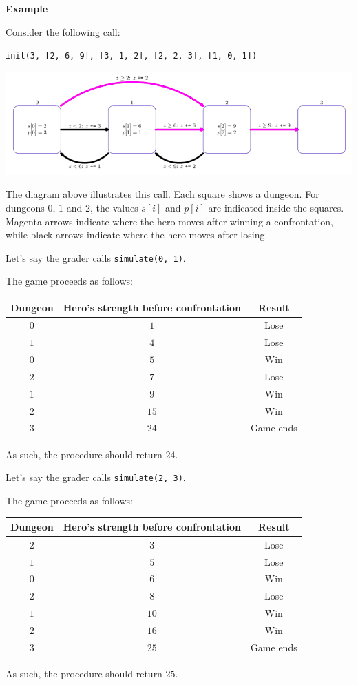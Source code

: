 \textbf{Example}

Consider the following call:

\texttt{init(3, [2, 6, 9], [3, 1, 2], [2, 2, 3], [1, 0, 1])}

\includegraphics[scale=0.6]{1.png}

The diagram above illustrates this call. Each square shows a dungeon. For dungeons $0$, $1$ and $2$,
the values $s[i]$ and $p[i]$ are indicated inside the squares. Magenta arrows indicate where the hero
moves after winning a confrontation, while black arrows indicate where the hero moves after losing.

Let's say the grader calls \texttt{simulate(0, 1)}.

The game proceeds as follows:

\begin{center}
\renewcommand{\arraystretch}{1.5}
\begin{tabular}{|c|c|c|}
\hline
 Dungeon & Hero's strength before confrontation & Result \\
\hline
 $0$ & $1$ & Lose \\
\hline
 $1$ & $4$ & Lose \\
\hline
 $0$ & $5$ & Win \\
\hline
 $2$ & $7$ & Lose \\
\hline
 $1$ & $9$ & Win \\
\hline
 $2$ & $15$ & Win \\
\hline
 $3$ & $24$ & Game ends \\
\hline
\end{tabular}
\end{center}

As such, the procedure should return $24$.

Let's say the grader calls \texttt{simulate(2, 3)}.

The game proceeds as follows:

\begin{center}
\renewcommand{\arraystretch}{1.5}
\begin{tabular}{|c|c|c|}
\hline
 Dungeon & Hero's strength before confrontation & Result \\
\hline
 $2$ & $3$ & Lose \\
\hline
 $1$ & $5$ & Lose \\
\hline
 $0$ & $6$ & Win \\
\hline
 $2$ & $8$ & Lose \\
\hline
 $1$ & $10$ & Win \\
\hline
 $2$ & $16$ & Win \\
\hline
 $3$ & $25$ & Game ends\\
\hline
\end{tabular}
\end{center}

As such, the procedure should return $25$.